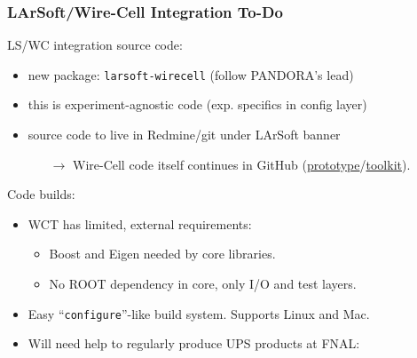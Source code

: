 \documentclass[xcolor=dvipsnames]{beamer}
\begin{document}
\begin{frame}
  \frametitle{LArSoft/Wire-Cell Integration To-Do}
  
  LS/WC integration source code:
  \begin{itemize}\footnotesize
  \item new package: \texttt{larsoft-wirecell} (follow PANDORA's lead)
  \item this is experiment-agnostic code (exp. specifics in config layer)
  \item source code to live in Redmine/git under LArSoft banner
    \begin{itemize}\scriptsize
    \item[$\rightarrow$] Wire-Cell code itself continues in GitHub (\href{https://github.com/bnlif/wire-cell}{prototype}/\href{https://github.com/WireCell/}{toolkit}).
    \end{itemize}
  \end{itemize}

  Code builds:
  \begin{itemize}\footnotesize
  \item WCT has limited, external requirements:
    \begin{itemize}\scriptsize
    \item Boost and Eigen needed by core libraries.
    \item No ROOT dependency in core, only I/O and test layers.
    \end{itemize}
  \item Easy ``\texttt{configure}''-like build system.  Supports Linux and Mac.
  \item Will need help to regularly produce UPS products at FNAL:

  \end{itemize}

\end{frame}
\end{document}
